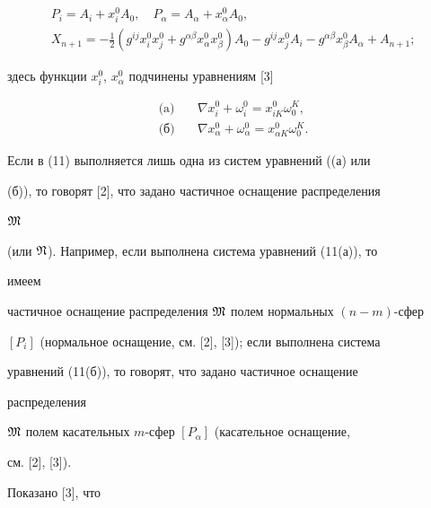 \begin{gather*} 


P_i=A_i+x^0_i A_0,\quad P_\alpha=A_\alpha+x^0_\alpha A_0,\\ 


X_{n+1}=-\frac{1}{2}(g^{i j}x^0_i x^0_j+ 


g^{\alpha\beta}x^0_\alpha x^0_\beta)A_0-g^{i j} 


x^0_j A_i-g^{\alpha\beta}x^0_\beta A_\alpha+A_{n+1}; 


\end{gather*} 


здесь функции $x^0_i$, $x^0_\alpha$ подчинены уравнениям [3] 


\begin{equation} 


\begin{split} 


\text{(a)} \quad & \nabla x^0_i+\omega^0_i=x^0_{i K}\omega^K_0,\\ 


\text{(б)} \quad & \nabla x^0_\alpha+\omega^0_\alpha= 


x^0_{\alpha K}\omega^K_0. 


\end{split} 


\end{equation} 


 


Если в (11) выполняется лишь одна из систем уравнений ((а) или 


(б)), то говорят [2], что задано частичное оснащение распределения 


$\frak M$ 


(или $\frak N$). Например, если выполнена система уравнений (11(а)), то 


имеем 


частичное оснащение распределения $\frak M$ полем нормальных $(n-m)$-сфер 


$[P_i]$ (нормальное оснащение, см. [2], [3]); если выполнена система 


уравнений (11(б)), то говорят, что задано частичное оснащение 


распределения 


$\frak M$ полем касательных $m$-сфер $[P_\alpha]$ (касательное оснащение, 


см. [2], [3]). 


 


Показано [3], что


